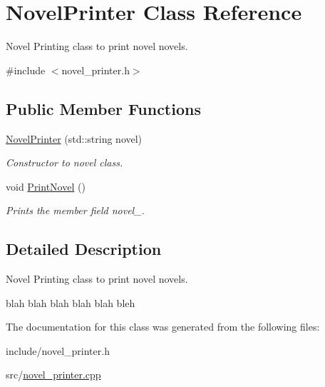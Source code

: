 \hypertarget{classNovelPrinter}{\section{Novel\-Printer Class Reference}
\label{classNovelPrinter}
}


Novel Printing class to print novel novels.  




{\ttfamily \#include $<$novel\-\_\-printer.\-h$>$}

\subsection*{Public Member Functions}
\begin{DoxyCompactItemize}
\item 
\hypertarget{classNovelPrinter_a9b312de4bc12a5de4d2ada68e8c5c50b}{\hyperlink{classNovelPrinter_a9b312de4bc12a5de4d2ada68e8c5c50b}{Novel\-Printer} (std\-::string novel)}\label{classNovelPrinter_a9b312de4bc12a5de4d2ada68e8c5c50b}

\begin{DoxyCompactList}\small\item\em Constructor to novel class. \end{DoxyCompactList}\item 
\hypertarget{classNovelPrinter_a207d50b9fe5bc2e2e90de753e05aa32c}{void \hyperlink{classNovelPrinter_a207d50b9fe5bc2e2e90de753e05aa32c}{Print\-Novel} ()}\label{classNovelPrinter_a207d50b9fe5bc2e2e90de753e05aa32c}

\begin{DoxyCompactList}\small\item\em Prints the member field novel\-\_\-. \end{DoxyCompactList}\end{DoxyCompactItemize}


\subsection{Detailed Description}
Novel Printing class to print novel novels. 

blah blah blah blah blah bleh 

The documentation for this class was generated from the following files\-:\begin{DoxyCompactItemize}
\item 
include/novel\-\_\-printer.\-h\item 
src/\hyperlink{novel__printer_8cpp}{novel\-\_\-printer.\-cpp}\end{DoxyCompactItemize}
